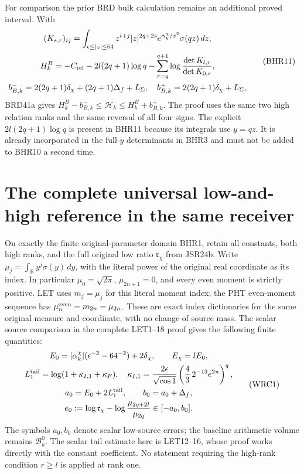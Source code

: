 \documentclass[11pt,a4paper]{article}
\newcommand{\R}{\mathbb R}
\begin{document}
For comparison the prior BRD bulk calculation remains
an additional proved interval. With
\[
\begin{gathered}
 (K_{s,r})_{ij}=\int_{\epsilon\leq|z|\leq64}
 z^{i+j}|z|^{2q+2s}e^{\alpha_k^\chi/z^2}\sigma(qz)\,dz,\\
 H_k^B=-C_{\rm rel}-2l(2q+1)\log q
     -\sum_{r=q}^{q+1}\log\frac{\det K_{l,r}}{\det K_{0,r}},\\
 b_{B,k}^-=2(2q+1)\delta_\chi+(2q+1)\Delta_f+L_\Sigma,
 \quad b_{B,k}^+=2(2q+1)\delta_\chi+L_\Sigma,
\end{gathered}\tag{BHR11}
\]
BRD41a gives
$H_k^B-b_{B,k}^-\leq\mathcal H_k\leq H_k^B+b_{B,k}^+$.
The proof uses the same two high relation ranks and
the same reversal of all four signs. The explicit
$2l(2q+1)\log q$ is present in BHR11 because its
integrals use $y=qz$. It is already incorporated in
the full-$y$ determinants in BHR3 and must not be
added to BHR10 a second time.

\section{The complete universal low-and-high reference in the same receiver}

On exactly the finite original-parameter domain BHR1, retain
all constants, both high ranks, and the full original low ratio
$\mathfrak r_\chi$ from JSR24b. Write
$\mu_j=\int_{\R}y^j\sigma(y)\,dy$, with the literal power
of the original real coordinate as its index. In particular
$\mu_0=\sqrt{2\pi}$, $\mu_{2n+1}=0$, and every even
moment is strictly positive. LET uses $m_j=\mu_j$ for
this literal moment index; the PHT
even-moment sequence has $\mu_n^{\rm even}=m_{2n}=\mu_{2n}$.
These are exact index dictionaries for the same original
measure and coordinate, with no change of source mass.
The scalar source comparison in
the complete LET1--18 proof gives the following finite quantities:
\[
\begin{gathered}
 E_0=|\alpha_k^\chi|(\epsilon^{-2}-64^{-2})+2\delta_\chi,
 \qquad E_\chi=lE_0,\\
 L_1^{\rm tail}=\log(1+\kappa_{I,1}+\kappa_F),\quad
 \kappa_{I,1}=\frac{2\epsilon}{\sqrt{\cos1}}
               \left(\frac43\,2^{-13}e^{2\pi}\right)^q,\\
 a_0=E_0+2L_1^{\rm tail},\qquad b_0=a_0+\Delta_f,\\
 e_0:=\log\mathfrak r_\chi-
                 \log\frac{\mu_{2q+2l}}{\mu_{2q}}
                    \in[-a_0,b_0].
\end{gathered}\tag{WRC1}
\]
The symbols $a_0,b_0$ denote scalar low-source errors;
the baseline arithmetic volume remains $\mathcal B_k^0$.
The scalar tail estimate here is LET12--16, whose proof
works directly with the constant coefficient. No statement
requiring the high-rank condition $r\geq l$ is applied at
rank one.
\end{document}
